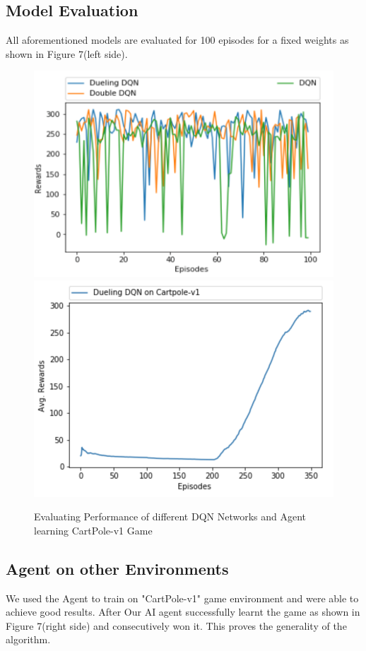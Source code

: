 \subsection{ Model Evaluation}

All aforementioned models are evaluated for 100 episodes for a fixed weights as shown in Figure 7(left side). \\  
\begin{figure}[!ht]
\centering
\includegraphics[scale=0.50,width=0.50\columnwidth]{figures/Picture2.png}%
\includegraphics[scale=0.50,width=0.50\columnwidth]{figures/Cartpolev1.png}%

\caption{ Evaluating Performance of different DQN Networks and Agent learning CartPole-v1 Game}%
\label{fig:Different DQN Performance}%
\end{figure}

\subsection{ Agent on other Environments}
We used the Agent to train on "CartPole-v1" game environment and were able to achieve good results. After Our AI agent successfully learnt the game as shown in Figure 7(right side) and consecutively won it. This proves the generality of the algorithm.

